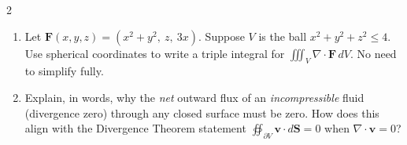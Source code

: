 \begin{multicols}{2}
\begin{enumerate}
\item \enspace
Let \(\mathbf{F}(x,y,z)= (x^2 + y^2,\ z,\ 3x)\). Suppose \(V\) is the ball \(x^2+y^2+z^2 \le 4\). Use spherical coordinates to write a triple integral for
\(\displaystyle \iiint_V \nabla\cdot \mathbf{F}\,dV.\)
No need to simplify fully.

\item 
Explain, in words, why the \emph{net} outward flux of an \emph{incompressible} fluid (divergence zero) through any closed surface must be zero. How does this align with the Divergence Theorem statement
\(\displaystyle \oiint_{\partial V}\mathbf{v}\cdot d\mathbf{S}=0\)
when \(\nabla\cdot\mathbf{v}=0\)?

\end{enumerate}
\end{multicols}

